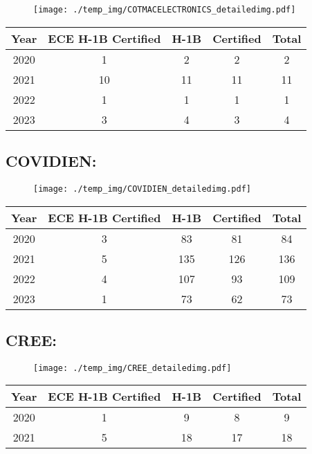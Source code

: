 \documentclass{article}%
\begin{document}
\begin{figure}[htbp]%
\centering%
\texttt{[image: ./temp\_img/COTMACELECTRONICS\_detailedimg.pdf]}%
\end{figure}

%
\begin{longtable}{c|c|c|c|c}%
\hline%
Year&ECE H{-}1B Certified&H{-}1B&Certified&Total\\%
\hline%
2020&1&2&2&2\\%
\hline%
2021&10&11&11&11\\%
\hline%
2022&1&1&1&1\\%
\hline%
2023&3&4&3&4\\%
\hline%
\end{longtable}

%
\newpage%
\subsection{COVIDIEN:}%
\label{subsec:COVIDIEN}%
\label{COVIDIENdetailed}%


\begin{figure}[htbp]%
\centering%
\texttt{[image: ./temp\_img/COVIDIEN\_detailedimg.pdf]}%
\end{figure}

%
\begin{longtable}{c|c|c|c|c}%
\hline%
Year&ECE H{-}1B Certified&H{-}1B&Certified&Total\\%
\hline%
2020&3&83&81&84\\%
\hline%
2021&5&135&126&136\\%
\hline%
2022&4&107&93&109\\%
\hline%
2023&1&73&62&73\\%
\hline%
\end{longtable}

%
\newpage%
\subsection{CREE:}%
\label{subsec:CREE}%
\label{CREEdetailed}%


\begin{figure}[htbp]%
\centering%
\texttt{[image: ./temp\_img/CREE\_detailedimg.pdf]}%
\end{figure}

%
\begin{longtable}{c|c|c|c|c}%
\hline%
Year&ECE H{-}1B Certified&H{-}1B&Certified&Total\\%
\hline%
2020&1&9&8&9\\%
\hline%
2021&5&18&17&18\\%
\hline%
\end{longtable}
\end{document}
